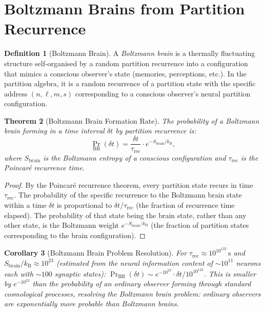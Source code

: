 \documentclass[twocolumn,10pt,a4paper]{article}
\theoremstyle{thmstyle}
\newtheorem{theorem}{Theorem}[section]
\newtheorem{corollary}[theorem]{Corollary}
\theoremstyle{definition}
\newtheorem{definition}[theorem]{Definition}
\theoremstyle{remark}
\newcommand{\kB}{k_{\mathrm{B}}}
\begin{document}
\section{Boltzmann Brains from Partition Recurrence}
\label{sec:bb}

\begin{definition}[Boltzmann Brain]
A \emph{Boltzmann brain} is a thermally fluctuating structure
self-organised by a random partition recurrence into a configuration
that mimics a conscious observer's state (memories, perceptions, etc.).
In the partition algebra, it is a random recurrence of a partition
state with the specific address $(n,\ell,m,s)$ corresponding to a
conscious observer's neural partition configuration.
\end{definition}

\begin{theorem}[Boltzmann Brain Formation Rate]
\label{thm:boltzmann_brain}
The probability of a Boltzmann brain forming in a time interval $\delta t$
by partition recurrence is:
\begin{equation}
\Pr_{\mathrm{BB}}(\delta t) = \frac{\delta t}{\tau_{\mathrm{rec}}}
\cdot e^{-S_{\mathrm{brain}}/\kB},
\label{eq:bb_rate}
\end{equation}
where $S_{\mathrm{brain}}$ is the Boltzmann entropy of a conscious
configuration and $\tau_{\mathrm{rec}}$ is the Poincar\'e recurrence time.
\end{theorem}

\begin{proof}
By the Poincar\'e recurrence theorem, every partition state recurs in
time $\tau_{\mathrm{rec}}$. The probability of the specific recurrence
to the Boltzmann brain state within a time $\delta t$ is proportional to
$\delta t/\tau_{\mathrm{rec}}$ (the fraction of recurrence time elapsed).
The probability of that state being the brain state, rather than any
other state, is the Boltzmann weight $e^{-S_{\mathrm{brain}}/\kB}$
(the fraction of partition states corresponding to the brain configuration).
\end{proof}

\begin{corollary}[Boltzmann Brain Problem Resolution]
For $\tau_{\mathrm{rec}} \approx 10^{10^{122}}\,\mathrm{s}$ and
$S_{\mathrm{brain}}/\kB \approx 10^{23}$ (estimated from the neural
information content of $\sim 10^{11}$ neurons each with $\sim 100$
synaptic states):
$\Pr_{\mathrm{BB}}(\delta t) \sim e^{-10^{23}} \cdot \delta t/10^{10^{122}}$.
This is smaller by $e^{-10^{23}}$ than the probability of an ordinary
observer forming through standard cosmological processes,
resolving the Boltzmann brain problem: ordinary observers are
exponentially more probable than Boltzmann brains.
\end{corollary}
\end{document}
